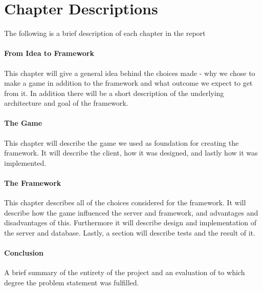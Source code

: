 \section{Chapter Descriptions}
The following is a brief description of each chapter in the report

\paragraph{From Idea to Framework}
This chapter will give a general idea behind the choices made - why we chose to make a game in addition to the framework and what outcome we expect to get from it. In addition there will be a short description of the underlying architecture and goal of the framework. 
\paragraph{The Game}
This chapter will describe the game we used as foundation for creating the framework. It will describe the client, how it was designed, and lastly how it was implemented.
\paragraph{The Framework}
This chapter describes all of the choices considered for the framework. It will describe how the game influenced the server and framework, and advantages and disadvantages of this. Furthermore it will describe design and implementation of the server and database. Lastly, a section will describe tests and the result of it.
\paragraph{Conclusion}
A brief summary of the entirety of the project and an evaluation of to which degree the problem statement was fulfilled.
